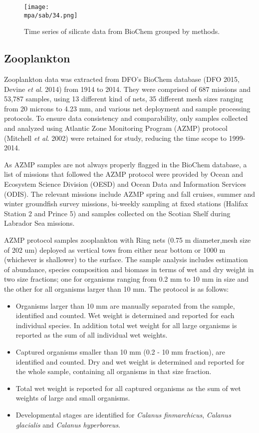 \documentclass[letterpaper,portrait,11pt]{scrartcl}
\numberwithin{equation}{section}		%
\numberwithin{figure}{section}		%
\numberwithin{table}{section}				%
\newcommand*{\D}{.}
\newcommand{\biodata}{\string~/bio\D data}   %
\newcommand{\mpa}{\biodata/bio\D indicators/mpa}  %
\begin{document}
\begin{appendices}
\begin{figure}[h]

  \centering
  \texttt{[image: \\mpa/sab/34.png]}
  \caption{Time series of silicate data from BioChem grouped by methods.}
    \label{fig:silicateTimeseries}
\end{figure}


\clearpage
\subsection{Zooplankton}

Zooplankton data was extracted from DFO's BioChem database (DFO 2015, Devine \textit{et al}. 2014) from 1914 to 2014. They were comprised of 687 missions and 53,787 samples, using 13 different kind of nets, 35 different mesh sizes ranging from 20 microns to 4.23 mm, and various net deployment and sample processing protocols.
To ensure data consistency and comparability, only samples collected and analyzed using Atlantic Zone Monitoring Program (AZMP) protocol (Mitchell \textit{et al}. 2002) were retained for study, reducing the time scope to 1999-2014. 

As AZMP samples are not always properly flagged in the BioChem database, a list of missions that followed the AZMP protocol were provided by Ocean and Ecosystem Science Division (OESD) and Ocean Data and Information Services (ODIS). The relevant missions include AZMP spring and fall cruises, summer and winter groundfish survey missions, bi-weekly sampling at fixed stations (Halifax Station 2 and Prince 5) and samples collected on the Scotian Shelf during Labrador Sea missions. 

AZMP protocol samples zooplankton with Ring nets (0.75 m diameter,mesh size of 202 um) deployed as vertical tows from either near bottom or 1000 m (whichever is shallower) to the surface. The sample analysis includes estimation of abundance, species composition and biomass in terms of wet and dry weight in two size fractions; one for organisms ranging from 0.2 mm to 10 mm in size and the other for all organisms larger than 10 mm.  The protocol is as follows:

\begin{itemize}
  \item Organisms larger than 10 mm are manually separated from the sample, identified and counted. Wet weight is determined and reported for each individual species. In addition total wet weight for all large organisms is reported as the sum of all individual wet weights.
  \item Captured organisms smaller than 10 mm (0.2 - 10 mm fraction), are identified and counted. Dry and wet weight is determined and reported for the whole sample, containing all organisms in that size fraction.
  \item Total wet weight is reported for all captured organisms as the sum of wet weights of large and small organisms.
  \item Developmental stages are identified for \textit{Calanus finmarchicus}, \textit{Calanus glacialis} and \textit{Calanus hyperboreus}. 
\end{itemize}



\end{appendices}
\end{document}
